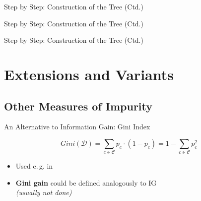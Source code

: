 \begin{frame}{Step by Step: Construction of the Tree (Ctd.)}{}
	
\end{frame}


\begin{frame}{Step by Step: Construction of the Tree (Ctd.)}{}
	
\end{frame}


\begin{frame}{Step by Step: Construction of the Tree (Ctd.)}{}
	
\end{frame}


\begin{frame}[plain]{}{}
	
\end{frame}


\section{Extensions and Variants}

\subsection{Other Measures of Impurity}

\begin{frame}{An Alternative to Information Gain: Gini Index}{}
	\begin{boxBlueNoFrame}
		\begin{equation}
			Gini(\mathcal{D})
				= \sum_{c \in \mathcal{C}} p_c \cdot (1 - p_c)
				= 1 -  \sum_{c \in \mathcal{C}} p_c^2
		\end{equation}
	\end{boxBlueNoFrame}
	\begin{itemize}
		\item Used e.\,g. in 
		\item \textbf{Gini gain} could be defined analogously to IG \\
			{\footnotesize \textit{(usually not done)}}
	\end{itemize}
\end{frame}


